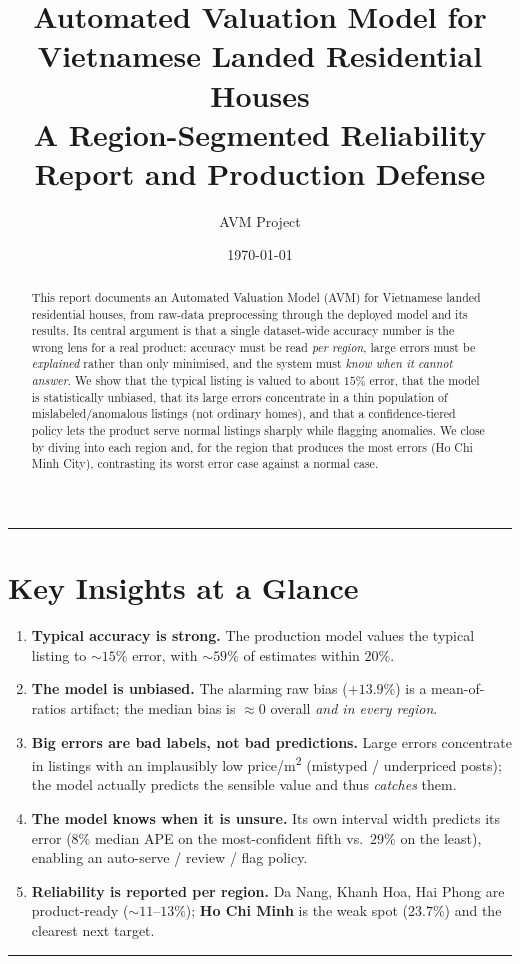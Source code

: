 \documentclass[11pt]{article}
\title{\textbf{Automated Valuation Model for Vietnamese Landed Residential Houses}\\[4pt]
\large A Region-Segmented Reliability Report and Production Defense}
\author{AVM Project}
\date{\today}
\newcommand{\pct}{\%}
\begin{document}
\maketitle

\begin{abstract}
\noindent This report documents an Automated Valuation Model (AVM) for Vietnamese landed
residential houses, from raw-data preprocessing through the deployed model and its results.
Its central argument is that a single dataset-wide accuracy number is the wrong lens for a real
product: accuracy must be read \emph{per region}, large errors must be \emph{explained} rather than
only minimised, and the system must \emph{know when it cannot answer}. We show that the typical
listing is valued to about $15\pct$ error, that the model is statistically unbiased, that its large
errors concentrate in a thin population of mislabeled/anomalous listings (not ordinary homes), and
that a confidence-tiered policy lets the product serve normal listings sharply while flagging
anomalies. We close by diving into each region and, for the region that produces the most errors
(Ho Chi Minh City), contrasting its worst error case against a normal case.
\end{abstract}

\tableofcontents
\bigskip
\hrule
\bigskip

\section*{Key Insights at a Glance}
\begin{enumerate}
  \item \textbf{Typical accuracy is strong.} The production model values the typical listing to
        \textbf{$\sim 15\pct$} error, with \textbf{$\sim 59\pct$} of estimates within $20\pct$.
  \item \textbf{The model is unbiased.} The alarming raw bias ($+13.9\pct$) is a mean-of-ratios
        artifact; the median bias is $\approx 0$ overall \emph{and in every region}.
  \item \textbf{Big errors are bad labels, not bad predictions.} Large errors concentrate in listings
        with an implausibly low price/m\textsuperscript{2} (mistyped / underpriced posts); the model
        actually predicts the sensible value and thus \emph{catches} them.
  \item \textbf{The model knows when it is unsure.} Its own interval width predicts its error
        ($8\pct$ median APE on the most-confident fifth vs.\ $29\pct$ on the least), enabling an
        auto-serve / review / flag policy.
  \item \textbf{Reliability is reported per region.} Da Nang, Khanh Hoa, Hai Phong are product-ready
        ($\sim 11$--$13\pct$); \textbf{Ho Chi Minh} is the weak spot ($23.7\pct$) and the clearest
        next target.
\end{enumerate}
\bigskip
\hrule
\end{document}
